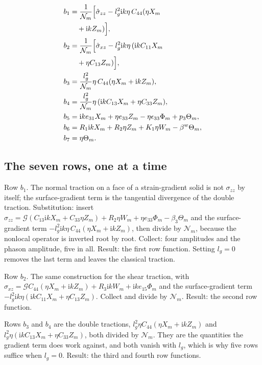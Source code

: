 \documentclass[11pt]{article}
\makeatletter
\newif\ifshowworked
\newenvironment{worked}{%
  \ifshowworked\par\smallskip\noindent\textit{Working.}\par\smallskip\else
  \setbox\z@\vbox\bgroup\fi}{\ifshowworked\par\smallskip\else\egroup\fi}
\newcommand{\ii}{\mathrm{i}}
\newcommand{\Ncal}{\mathcal{N}}
\newcommand{\Gcal}{\mathcal{G}}
\makeatother
\begin{document}
\begin{align}
b_1&=\frac{1}{\Ncal_m}\Bigl[\hat\sigma_{zz}-l_g^2\ii k\eta\,C_{44}(\eta X_m \nonumber\\
&\quad +\ii kZ_m)\Bigr], \\
b_2&=\frac{1}{\Ncal_m}\Bigl[\hat\sigma_{xz}-l_g^2\ii k\eta\,(\ii kC_{11}X_m \nonumber\\
&\quad +\eta C_{13}Z_m)\Bigr], \\
b_3&=\frac{l_g^2}{\Ncal_m}\eta\,C_{44}(\eta X_m+\ii kZ_m), \\
b_4&=\frac{l_g^2}{\Ncal_m}\eta\,(\ii kC_{13}X_m+\eta C_{33}Z_m), \\
b_5&=\ii ke_{31}X_m+\eta e_{33}Z_m-\eta\epsilon_{33}\Phi_m+p_3\Theta_m, \\
b_6&=R_1\ii kX_m+R_2\eta Z_m+K_1\eta W_m-\beta^{w}\Theta_m, \\
b_7&=\eta\Theta_m .
\end{align}
\subsection*{The seven rows, one at a time}

\begin{worked}
Row $b_1$. The normal traction on a face of a strain-gradient solid is not $\sigma_{zz}$ by itself; the
surface-gradient term is the tangential divergence of the double traction. Substitution: insert
$\hat\sigma_{zz}=\Gcal(C_{13}\ii kX_m+C_{33}\eta Z_m)+R_2\eta W_m+\eta e_{33}\Phi_m-\beta_3\Theta_m$ and
the surface-gradient term $-l_g^2\ii k\eta\,C_{44}(\eta X_m+\ii kZ_m)$, then divide by $\Ncal_m$, because
the nonlocal operator is inverted root by root. Collect: four amplitudes and the phason amplitude, five
in all. Result: the first row function. Setting $l_g=0$ removes the last term and leaves the classical
traction.
\end{worked}

\begin{worked}
Row $b_2$. The same construction for the shear traction, with
$\hat\sigma_{xz}=\Gcal C_{44}(\eta X_m+\ii kZ_m)+R_3\ii kW_m+\ii ke_{15}\Phi_m$ and the surface-gradient
term $-l_g^2\ii k\eta(\ii kC_{11}X_m+\eta C_{13}Z_m)$. Collect and divide by $\Ncal_m$. Result: the second
row function.
\end{worked}

\begin{worked}
Rows $b_3$ and $b_4$ are the double tractions, $l_g^2\eta C_{44}(\eta X_m+\ii kZ_m)$ and
$l_g^2\eta(\ii kC_{13}X_m+\eta C_{33}Z_m)$, both divided by $\Ncal_m$. They are the quantities the
gradient term does work against, and both vanish with $l_g$, which is why five rows suffice when
$l_g=0$. Result: the third and fourth row functions.
\end{worked}
\end{document}

